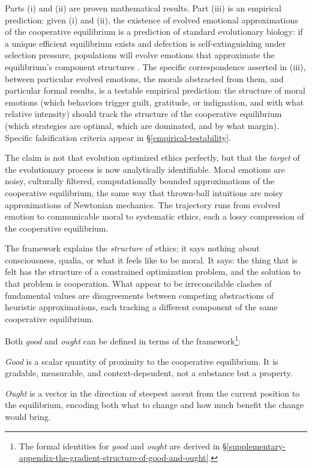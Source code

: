 \documentclass[11pt]{article}
\theoremstyle{plain}
\theoremstyle{definition}
\theoremstyle{remark}
\begin{document}
Parts (i) and (ii) are proven mathematical results. Part (iii) is an
empirical prediction: given (i) and (ii), the existence of evolved
emotional approximations of the cooperative equilibrium is a prediction
of standard evolutionary biology: if a unique efficient equilibrium
exists and defection is self-extinguishing under selection pressure,
populations will evolve emotions that approximate the equilibrium's
component structures \citep{Gigerenzer1999, GigerenzerGaissmaier2011}.
The specific correspondence asserted in (iii), between particular
evolved emotions, the morals abstracted from them, and particular formal
results, is a testable empirical prediction: the structure of moral
emotions (which behaviors trigger guilt, gratitude, or indignation, and
with what relative intensity) should track the structure of the
cooperative equilibrium (which strategies are optimal, which are
dominated, and by what margin). Specific falsification criteria appear
in §\ref{empirical-testability}.

The claim is not that evolution optimized ethics perfectly, but that the
\emph{target} of the evolutionary process is now analytically
identifiable. Moral emotions are noisy, culturally filtered,
computationally bounded approximations of the cooperative equilibrium,
the same way that thrown-ball intuitions are noisy approximations of
Newtonian mechanics. The trajectory runs from evolved emotion to
communicable moral to systematic ethics, each a lossy compression of the
cooperative equilibrium.

The framework explains the \emph{structure} of ethics; it says nothing
about consciousness, qualia, or what it feels like to be moral. It says:
the thing that is felt has the structure of a constrained optimization
problem, and the solution to that problem is cooperation. What appear to
be irreconcilable clashes of fundamental values are disagreements
between competing abstractions of heuristic approximations, each
tracking a different component of the same cooperative equilibrium.

Both \emph{good} and \emph{ought} can be defined in terms of the
framework\footnote{The formal identities for \emph{good} and
  \emph{ought} are derived in
  §\ref{supplementary-appendix-the-gradient-structure-of-good-and-ought}.}:

\emph{Good} is a scalar quantity of proximity to the cooperative
equilibrium. It is gradable, measurable, and context-dependent, not a
substance but a property.

\emph{Ought} is a vector in the direction of steepest ascent from the
current position to the equilibrium, encoding both what to change and
how much benefit the change would bring.
\end{document}

